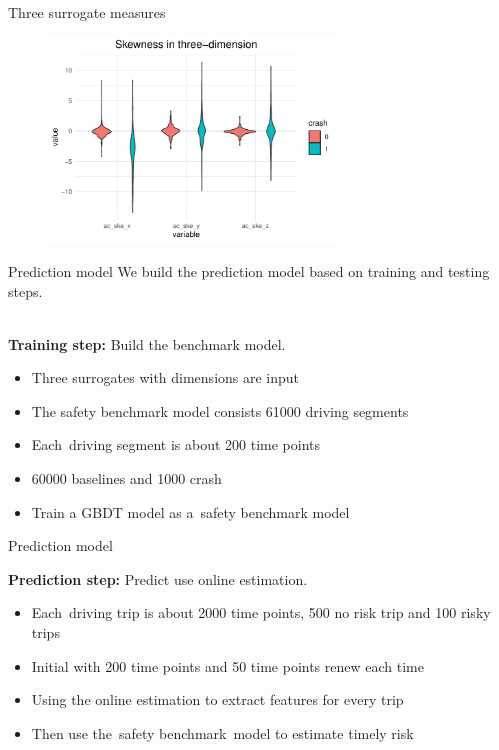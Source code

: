 \documentclass{beamer}
\begin{document}
{    \begin{frame}{Three surrogate measures}
    	\begin{figure}[htbp]
    		\centering
    		\includegraphics[width=3.0in]{figs/fig_ske}
    		\label{fig_std}
    	\end{figure}
    \end{frame}
    
    
    \begin{frame}{Prediction model}
     We build the prediction model based on training and testing steps.
     
     ~\\
     
     \textbf{Training step:} Build the benchmark model.
     \begin{itemize}
     	\item Three surrogates with dimensions are input
     	\item The safety benchmark model consists 61000 driving segments
     	\item Each driving segment is about 200 time points
     	\item 60000 baselines and 1000 crash
     	\item Train a GBDT model as a safety benchmark model
     \end{itemize}
    \end{frame}

    \begin{frame}{Prediction model}

    	\textbf{Prediction step:} Predict use online estimation.
    	\begin{itemize}
    		\item Each driving trip is about 2000 time points, 500 no risk trip and 100 risky trips
    		\item Initial with 200 time points and 50 time points renew each time
    		\item Using the online estimation to extract features for every trip
    		\item Then use the safety benchmark model to estimate timely risk
    	\end{itemize}
    \end{frame}


}
\end{document}
